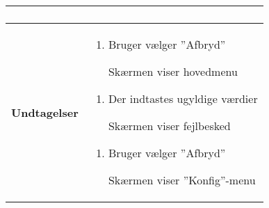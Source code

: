 \begin{center}
\begin{longtable}{|p{5cm}|p{9cm}|}
\begin{enumerate}
	
			\end{enumerate}\\\hline
		\textbf{Undtagelser}
			&\begin{enumerate}[label=\ref{uc2afbryd}.a]
				
				\item Bruger vælger ''Afbryd''
				
					\subitem Skærmen viser hovedmenu
			\end{enumerate}
			
			\begin{enumerate}[label=\ref{uc2afbryd2}.a]
				
				\item Der indtastes ugyldige værdier	
				
					\subitem Skærmen viser fejlbesked
			\end{enumerate}			
			
			\begin{enumerate}[label=\ref{uc2afbryd3}.a]
				
				\item Bruger vælger ''Afbryd''
				
				\subitem Skærmen viser ''Konfig''-menu
				

			\end{enumerate}														\\\hline
	\end{longtable}
\end{center}

